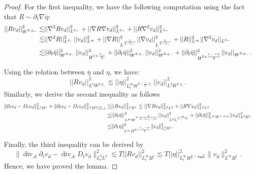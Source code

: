 \documentclass[letterpaper,reqno,10pt,twoside]{amsart}
\theoremstyle{definition}
\theoremstyle{remark}
\def\p{\partial}
\begin{document}
	\begin{proof}
		
		For the first inequality, we have the following computation using the fact that $R\sim \partial_{t}\nabla\bar{\eta}$:
		\[\begin{aligned}
			\vert \vert Rv_{d}\vert \vert^{2}_{W^{2,q_{-}}}\lesssim& \vert \vert \nabla^{2}R v_{d}\vert \vert^{2}_{L^{q_{-}}}+\vert \vert \nabla R\nabla v_{d}\vert \vert_{L^{q_{-}}}^{2}+\vert\vert R\nabla^{2}v_{d}\vert\vert_{L^{q_{-}}}^{2}\notag\\
			\lesssim&\vert \vert \nabla^{2}R\vert \vert^{2}_{L^{q_{-}}}\vert \vert v_{d}\vert \vert^{2}_{L^{\infty}}+\vert \vert \nabla R\vert \vert^{2}_{L^{\frac{1}{1-{\varepsilon_{-}}}}}\vert \vert \nabla v_{d}\vert \vert_{L^{\frac{1}{1-\varepsilon_{-}}}}^{2}+\vert \vert R\vert \vert^{2}_{L^{\infty}}\vert \vert \nabla^{2}v_{d}\vert \vert_{L^{q_{-}}}\notag\\
			\lesssim& \vert \vert \partial_{t}\bar{\eta}\vert \vert^{2}_{W^{3,q_{-}}}\vert \vert v_{d}\vert \vert_{H^{1+\frac{\varepsilon_{-}}{2}}}^{2}+\vert \vert \partial_{t}\bar{\eta}\vert \vert_{W^{3,q_{-}}}^{2}\vert \vert v_{d}\vert \vert^{2}_{W^{2,q_{-}}}+\vert \vert \partial_{t}\bar{\eta}\vert \vert_{H^{2+\frac{\varepsilon_{-}-\alpha}{2}}}^{2}\vert \vert v_{d}\vert \vert_{W^{2,q_{-}}}.
		\end{aligned}\]
		
		\noindent Using the relation between $\bar{\eta}$ and $\eta$, we have:
		\[
		\vert \vert Rv_{d}\vert \vert^{2}_{L^{2}W^{2,q_{-}}}\lesssim \vert \vert \eta\vert \vert_{L_{t}^{\infty}W^{3-\frac{1}{q_{-}},q_{-}}}^{2}\vert \vert v_{d}\vert \vert_{L^{2}W^{2,q_{-}}}^{2}.
		\]
		Similarly, we derive the second inequality as follows
		\[\begin{aligned}
			\|\p_t v_{d}-D_tv_{d}\|_{L^2H^1}^2+\|\p_tv_{d}-D_tv_{d}\|_{L^2H^0(\Sigma_s)}^2\lesssim & \vert \vert Rv_{d}\vert \vert_{L^{2}H^{1}}^{2}\lesssim \vert \vert \nabla Rv_{d}\vert \vert^{2}_{L^{2}L^{2}}+\vert \vert R\nabla v_{d}\vert \vert_{L^{2}L^{2}}^{2}\notag\\
			\lesssim& \vert \vert \partial_{t}\bar{\eta}\vert \vert_{L^{\infty}W^{2,\frac{4}{2-(\varepsilon_{-}-\alpha)}}}^{2}\vert\vert v_{d}\vert \vert_{L^{2}L^{\frac{4}{\varepsilon_{-}-\alpha}}}^{2}+\vert \vert \partial_{t}\bar{\eta}\vert \vert^{2}_{L^{\infty}W^{1,+\infty}}\vert \vert v_{d}\vert \vert^{2}_{L^{2}H^{1}}\notag\\
			\lesssim& \|\p_{t}\eta\|^{2}_{L^{\infty}H^{2+\frac{\varepsilon_{-}-\alpha}{2}}}\|v_{d}\|_{L_{t}^{2}H^{1}}^{2}.
		\end{aligned}\]
		
		Finally, the third inequality can be derived by
		\[
		\|\operatorname{div}_{\mathcal{A}}\partial_{t}v_{d}-\operatorname{div}_{\mathcal{A}}D_{t}v_{d}\|^{2}_{L_{t}^{2}L^{2}}\lesssim T\vert \vert Rv_{d}\vert \vert_{L_{t}^{\infty}H^{1}}^{2}\lesssim T\vert \vert \eta\vert \vert^{2}_{L_{t}^{\infty}H^{\frac{3}{2}+\frac{\varepsilon_{-}-\alpha}{2}}}\|v_{d}\|_{L^\infty H^1}^2.
		\]
		Hence, we have proved the lemma.
	\end{proof}
\end{document}
